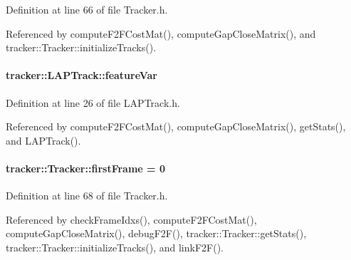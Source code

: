 Definition at line 66 of file Tracker.\+h.



Referenced by compute\+F2\+F\+Cost\+Mat(), compute\+Gap\+Close\+Matrix(), and tracker\+::\+Tracker\+::initialize\+Tracks().

\paragraph[{\texorpdfstring{feature\+Var}{featureVar}}]{ tracker\+::\+L\+A\+P\+Track\+::feature\+Var}\hypertarget{classtracker_1_1LAPTrack_a69599f06e61865ba634d6c88a1119319}{}\label{classtracker_1_1LAPTrack_a69599f06e61865ba634d6c88a1119319}


Definition at line 26 of file L\+A\+P\+Track.\+h.



Referenced by compute\+F2\+F\+Cost\+Mat(), compute\+Gap\+Close\+Matrix(), get\+Stats(), and L\+A\+P\+Track().

\paragraph[{\texorpdfstring{first\+Frame}{firstFrame}}]{ tracker\+::\+Tracker\+::first\+Frame = 0\hspace{0.3cm}{\ttfamily [inherited]}}\hypertarget{classtracker_1_1Tracker_a3ba78a0a502bd2ac432601fc204e3ba1}{}\label{classtracker_1_1Tracker_a3ba78a0a502bd2ac432601fc204e3ba1}


Definition at line 68 of file Tracker.\+h.



Referenced by check\+Frame\+Idxs(), compute\+F2\+F\+Cost\+Mat(), compute\+Gap\+Close\+Matrix(), debug\+F2\+F(), tracker\+::\+Tracker\+::get\+Stats(), tracker\+::\+Tracker\+::initialize\+Tracks(), and link\+F2\+F().

